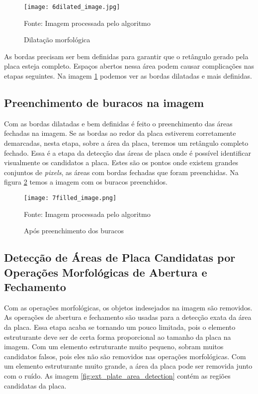 \begin{figure}[H]
	\centering
	\texttt{[image: 6dilated\_image.jpg]}
	\caption{Dilatação morfológica}
Fonte: Imagem processada pelo algoritmo
	\label{fig:ext_morphological_dilation}
\end{figure}

As bordas precisam ser bem definidas para garantir que o retângulo gerado pela placa esteja completo. Espaços abertos nessa área podem causar complicações nas etapas seguintes. Na imagem \ref{fig:ext_morphological_dilation} podemos ver as bordas dilatadas e mais definidas.

\subsection{Preenchimento de buracos na imagem}

Com as bordas dilatadas e bem definidas é feito o preenchimento das áreas fechadas na imagem. Se as bordas ao redor da placa estiverem corretamente demarcadas, nesta etapa, sobre a área da placa, teremos um retângulo completo fechado. Essa é a etapa da detecção das áreas de placa onde é possível identificar visualmente os candidatos a placa. Estes são os pontos onde existem grandes conjuntos de \emph{pixels}, as áreas com bordas fechadas que foram preenchidas. Na figura \ref{fig:ext_holes_filled} temos a imagem com os buracos preenchidos.

\begin{figure}[H]
	\centering
	\texttt{[image: 7filled\_image.png]}
	\caption{Após preenchimento dos buracos}
Fonte: Imagem processada pelo algoritmo
	\label{fig:ext_holes_filled}
\end{figure}

\subsection{Detecção de Áreas de Placa Candidatas por Operações Morfológicas de Abertura e Fechamento}

Com as operações morfológicas, os objetos indesejados na imagem são removidos. As operações de abertura e fechamento são usadas para a detecção exata da área da placa. Essa etapa acaba se tornando um pouco limitada, pois o elemento estruturante deve ser de certa forma proporcional ao tamanho da placa na imagem. Com um elemento estruturante muito pequeno, sobram muitos candidatos falsos, pois eles não são removidos nas operações morfológicas. Com um elemento estruturante muito grande, a área da placa pode ser removida junto com o ruído. As imagem \ref{fig:ext_plate_area_detection} contém as regiões candidatas da placa.

